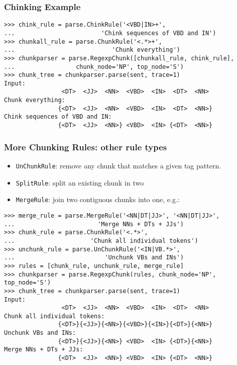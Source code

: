 \documentclass{beamer}             %
\begin{document}
\begin{frame}[fragile]
  \frametitle{Chinking Example}
  \scriptsize

\begin{verbatim}
>>> chink_rule = parse.ChinkRule('<VBD|IN>+',
...                        'Chink sequences of VBD and IN')
>>> chunkall_rule = parse.ChunkRule('<.*>+',
...                           'Chunk everything')
>>> chunkparser = parse.RegexpChunk([chunkall_rule, chink_rule],
...                 chunk_node='NP', top_node='S')
>>> chunk_tree = chunkparser.parse(sent, trace=1)
Input:
                <DT>  <JJ>  <NN>  <VBD>  <IN>  <DT>  <NN> 
Chunk everything:
               {<DT>  <JJ>  <NN>  <VBD>  <IN>  <DT>  <NN>}
Chink sequences of VBD and IN:
               {<DT>  <JJ>  <NN>} <VBD>  <IN> {<DT>  <NN>}
\end{verbatim}
\end{frame}

\begin{frame}[fragile]
  \frametitle{More Chunking Rules: other rule types}
  \scriptsize

  \begin{itemize}
  \item \texttt{UnChunkRule}: remove any chunk that matches a given
    tag pattern.
  \item \texttt{SplitRule}: split an existing chunk in two
  \item \texttt{MergeRule}: join two contiguous chunks into one, e.g.:
  \end{itemize}

  \tiny
\begin{verbatim}
>>> merge_rule = parse.MergeRule('<NN|DT|JJ>', '<NN|DT|JJ>',
...                       'Merge NNs + DTs + JJs')
>>> chunk_rule = parse.ChunkRule('<.*>',
...                     'Chunk all individual tokens')
>>> unchunk_rule = parse.UnChunkRule('<IN|VB.*>',
...                         'Unchunk VBs and INs')
>>> rules = [chunk_rule, unchunk_rule, merge_rule]
>>> chunkparser = parse.RegexpChunk(rules, chunk_node='NP', top_node='S')
>>> chunk_tree = chunkparser.parse(sent, trace=1)
Input:
                <DT>  <JJ>  <NN>  <VBD>  <IN>  <DT>  <NN> 
Chunk all individual tokens:
               {<DT>}{<JJ>}{<NN>}{<VBD>}{<IN>}{<DT>}{<NN>}
Unchunk VBs and INs:
               {<DT>}{<JJ>}{<NN>} <VBD>  <IN> {<DT>}{<NN>}
Merge NNs + DTs + JJs:
               {<DT>  <JJ>  <NN>} <VBD>  <IN> {<DT>  <NN>}
\end{verbatim}
\end{frame}
\end{document}
